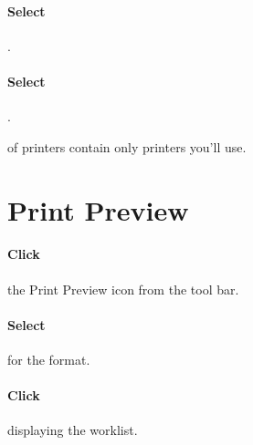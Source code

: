 \paragraph{Select} .

\paragraph{Select} .\\



 of printers contain only printers you'll use.\\


\section{Print Preview}

\paragraph{Click} the Print Preview  icon from the tool bar.

\paragraph{Select}  for the format.\\

\paragraph{Click} 

 displaying the worklist.\\

